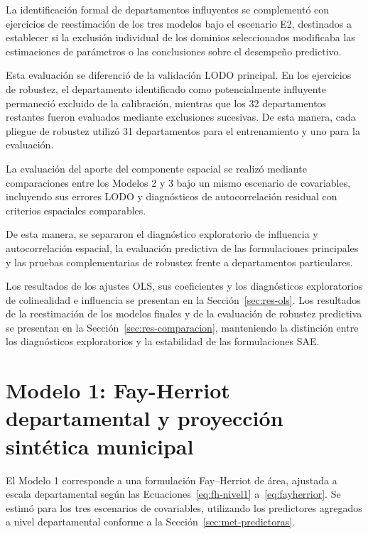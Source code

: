 La identificación formal de departamentos influyentes se complementó con ejercicios de reestimación de los tres modelos bajo el escenario E2, destinados a establecer si la exclusión individual de los dominios seleccionados modificaba las estimaciones de parámetros o las conclusiones sobre el desempeño predictivo.

Esta evaluación se diferenció de la validación LODO principal. En los ejercicios de robustez, el departamento identificado como potencialmente influyente permaneció excluido de la calibración, mientras que los 32 departamentos restantes fueron evaluados mediante exclusiones sucesivas. De esta manera, cada pliegue de robustez utilizó 31 departamentos para el entrenamiento y uno para la evaluación.

La evaluación del aporte del componente espacial se realizó mediante comparaciones entre los Modelos 2 y 3 bajo un mismo escenario de covariables, incluyendo sus errores LODO y diagnósticos de autocorrelación residual con criterios espaciales comparables.

De esta manera, se separaron el diagnóstico exploratorio de influencia y autocorrelación espacial, la evaluación predictiva de las formulaciones principales y las pruebas complementarias de robustez frente a departamentos particulares.

Los resultados de los ajustes OLS, sus coeficientes y los diagnósticos exploratorios de colinealidad e influencia se presentan en la Sección~\ref{sec:res-ols}. Los resultados de la reestimación de los modelos finales y de la evaluación de robustez predictiva se presentan en la Sección~\ref{sec:res-comparacion}, manteniendo la distinción entre los diagnósticos exploratorios y la estabilidad de las formulaciones SAE.




\section{Modelo 1: Fay-Herriot departamental y proyección sintética municipal}
\label{sec:met-fh}

El Modelo 1 corresponde a una formulación Fay--Herriot de área, ajustada a escala departamental según las Ecuaciones~\ref{eq:fh-nivel1} a~\ref{eq:fayherrior}. Se estimó para los tres escenarios de covariables, utilizando los predictores agregados a nivel departamental conforme a la Sección~\ref{sec:met-predictoras}.

